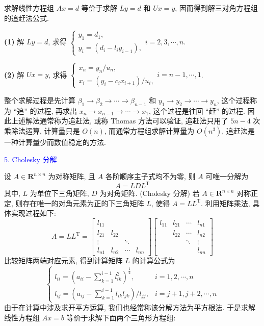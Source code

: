 求解线性方程组 $ A x=d $ 等价于求解 $ L y=d $ 和 $ U x=y $, 因而得到解三对角方程组的追赶法公式.

\textbf{(1)} 解 $ L y=d $, 求得 $ \left\{\begin{array}{l}y_{1}=d_{1}, \\ y_{i}=\left(d_{i}-l_{i} y_{i-1}\right),\end{array} i=2,3, \cdots, n\right. $.

\textbf{(2)} 解 $ U x=y $, 求得 $ \left\{\begin{array}{l}x_{n}=y_{n} / u_{n}, \\ x_{i}=\left(y_{i}-c_{i} x_{i+1}\right) / u_{i},\end{array} i=n-1, \cdots, 1\right. $.

整个求解过程是先计算 $ \beta_{1} \rightarrow \beta_{2} \rightarrow \cdots \rightarrow \beta_{n-1} $ 和 $ y_{1} \rightarrow y_{2} \rightarrow \cdots \rightarrow y_{n} $, 这个过程称为 “追” 的过程, 再求出 $ x_{n} \rightarrow x_{n-1} \rightarrow \cdots \rightarrow x_{1} $, 这个过程是往回 “赶” 的过程. 因此上述解法通常称为追赶法, 或称 Thomas 方法可以验证, 追赶法只用了 $ 5 n-4 $ 次乘除法运算, 计算量只是 $ O(n) $, 而通常方程组求解计算量为 $ O\left(n^{3}\right) $, 追赶法是一种计算量少而数值稳定的方法.


\textcolor{blue}{5. Cholesky 分解}

设 $ A \in \mathbf{R}^{n \times n} $ 为对称矩阵, 且 $ A $ 各阶顺序主子式均不为零, 则 $ A $ 可唯一分解为
$$
A=L D L^{\mathrm{T}}
$$
其中, $ L $ 为单位下三角矩阵, $ D $ 为对角矩阵.
(Cholesky 分解) 若 $ A \in \mathbf{R}^{n \times n} $ 对称正定, 则存在唯一的对角元素为正的下三角矩阵 $ L $, 使得 $ A=L L^{\mathrm{T}} $.
利用矩阵乘法, 具体实现过程如下:
$$
A=L L^{\mathrm{T}}=\left[\begin{array}{cccc}
l_{11} & & & \\
l_{21} & l_{22} & & \\
\vdots & & \ddots & \\
l_{n 1} & l_{n 2} & \cdots & l_{n n}
\end{array}\right]\left[\begin{array}{cccc}
l_{11} & l_{21} & \cdots & l_{n 1} \\
& l_{22} & \cdots & l_{n 2} \\
& & \ddots & \vdots \\
& & & l_{n n}
\end{array}\right]
$$
比较矩阵两端对应元素, 得到计算矩阵 $ L $ 的计算公式为
$$
\left\{\begin{array}{ll}
l_{i i}=\left(a_{i i}-\sum\limits_{k=1}^{i-1} l_{i k}^{2}\right)^{\frac{1}{2}}, & i=1,2, \cdots, n \\
l_{i j}=\left(a_{i j}-\sum\limits_{k=1}^{i-1} l_{i k} l_{j k}\right) / l_{j j}, & i=j+1, j+2, \cdots, n
\end{array}\right.
$$
由于在计算中涉及求开平方运算, 我们也经常称该分解方法为平方根法. 于是求解线性方程组 $ A x=b $ 等价于求解下面两个三角形方程组:

